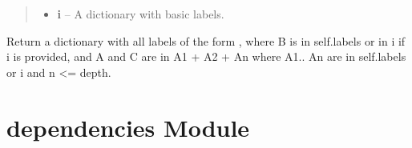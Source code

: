 \documentclass[letterpaper,10pt,english]{sphinxmanual}
\begin{document}
\begin{fulllineitems}
\begin{fulllineitems}
\begin{quote}
\begin{description}
\begin{itemize}
\item {} 
\textbf{i} -- A dictionary with basic labels.

\end{itemize}

\end{description}\end{quote}

Return a dictionary with all labels of the form
, where B is in self.labels or in i if i is provided,
and A and C are in A1 + A2 + An where A1.. An are in
self.labels or i and n \textless{}= depth.

\end{fulllineitems}


\end{fulllineitems}


\begin{fulllineitems}
\label{labelling:labelling.demo}
\end{fulllineitems}



\chapter{dependencies Module}
\label{process_hats:dependencies-module}\label{process_hats::doc}\label{process_hats:module-process_hats}
\end{document}
